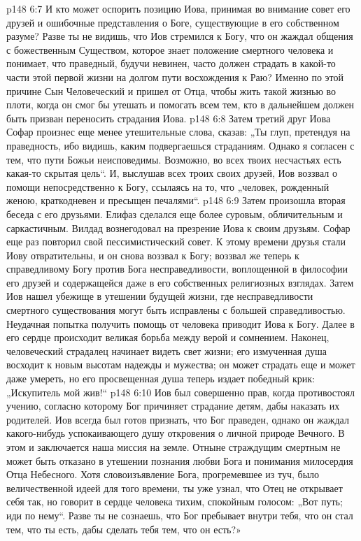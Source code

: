 \vs p148 6:7 И кто может оспорить позицию Иова, принимая во внимание совет его друзей и ошибочные представления о Боге, существующие в его собственном разуме? Разве ты не видишь, что Иов стремился к  Богу, что он жаждал общения с божественным Существом, которое знает положение смертного человека и понимает, что праведный, будучи невинен, часто должен страдать в какой\hyp{}то части этой первой жизни на долгом пути восхождения к Раю? Именно по этой причине Сын Человеческий и пришел от Отца, чтобы жить такой жизнью во плоти, когда он смог бы утешать и помогать всем тем, кто в дальнейшем должен быть призван переносить страдания Иова.
\vs p148 6:8 Затем третий друг Иова Софар произнес еще менее утешительные слова, сказав: „Ты глуп, претендуя на праведность, ибо видишь, каким подвергаешься страданиям. Однако я согласен с тем, что пути Божьи неисповедимы. Возможно, во всех твоих несчастьях есть какая\hyp{}то скрытая цель“. И, выслушав всех троих своих друзей, Иов воззвал о помощи непосредственно к Богу, ссылаясь на то, что „человек, рожденный женою, краткодневен и пресыщен печалями“.
\vs p148 6:9 Затем произошла вторая беседа с его друзьями. Елифаз сделался еще более суровым, обличительным и саркастичным. Вилдад вознегодовал на презрение Иова к своим друзьям. Софар еще раз повторил свой пессимистический совет. К этому времени друзья стали Иову отвратительны, и он снова воззвал к Богу; воззвал же теперь к справедливому Богу против Бога несправедливости, воплощенной в философии его друзей и содержащейся даже в его собственных религиозных взглядах. Затем Иов нашел убежище в утешении будущей жизни, где несправедливости смертного существования могут быть исправлены с большей справедливостью. Неудачная попытка получить помощь от человека приводит Иова к Богу. Далее в его сердце происходит великая борьба между верой и сомнением. Наконец, человеческий страдалец начинает видеть свет жизни; его измученная душа восходит к новым высотам надежды и мужества; он может страдать еще и может даже умереть, но его просвещенная душа теперь издает победный крик: „Искупитель мой жив!“
\vs p148 6:10 Иов был совершенно прав, когда противостоял учению, согласно которому Бог причиняет страдание детям, дабы наказать их родителей. Иов всегда был готов признать, что Бог праведен, однако он жаждал какого\hyp{}нибудь успокаивающего душу откровения о личной природе Вечного. В этом и заключается наша миссия на земле. Отныне страждущим смертным не может быть отказано в утешении познания любви Бога и понимания милосердия Отца Небесного. Хотя словоизъявление Бога, прогремевшее из туч, было величественной идеей для того времени, ты уже узнал, что Отец не открывает себя так, но говорит в сердце человека тихим, спокойным голосом: „Вот путь; иди по нему“. Разве ты не сознаешь, что Бог пребывает внутри тебя, что он стал тем, что ты есть, дабы сделать тебя тем, что он есть?»
